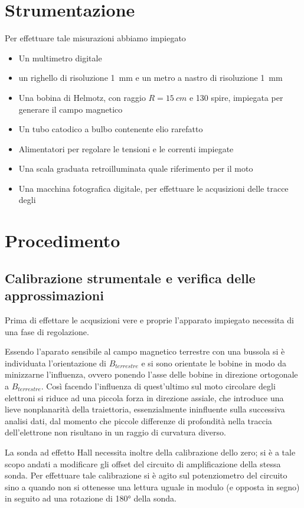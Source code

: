 \section{Strumentazione}
	Per effettuare tale misurazioni abbiamo impiegato
	\begin{itemize}[$\cdot$]
		\item Un multimetro digitale
		\item un righello di risoluzione \SI{1}{\mm} e un metro a nastro di risoluzione \SI{1}{\mm}
		\item Una bobina di Helmotz, con raggio $R = \SI{15}{cm}$ e 130 spire, impiegata per generare il campo magnetico
		\item Un tubo catodico a bulbo contenente elio rarefatto
		\item Alimentatori per regolare le tensioni e le correnti impiegate
		\item Una scala graduata retroilluminata quale riferimento per il moto
		\item Una macchina fotografica digitale, per effettuare le acqusizioni
		delle tracce degli \e
	\end{itemize}
\section{Procedimento}
	\subsection{Calibrazione strumentale e verifica delle approssimazioni}
		Prima di effettare le acqusizioni vere e proprie l'apparato impiegato necessita di una
		fase di regolazione.

		Essendo l'aparato sensibile al campo magnetico terrestre
		con una bussola si è individuata l'orientazione di $B_{terrestre}$
		e si sono orientate le bobine in modo da minizzarne l'influenza, ovvero ponendo
		l'asse delle bobine in direzione ortogonale a $B_{terrestre}$. Così facendo l'influenza
		di quest'ultimo sul moto circolare degli elettroni si riduce ad una
		piccola forza in direzione assiale, che introduce una lieve nonplanarità della traiettoria,
		essenzialmente ininfluente sulla successiva analisi dati, dal momento che
		piccole differenze di profondità nella traccia dell'elettrone non risultano
		in un raggio di curvatura diverso.

		La sonda ad effetto Hall necessita inoltre della calibrazione dello zero;
		si è a tale scopo andati a modificare gli offset del circuito di amplificazione della stessa sonda.
		Per effettuare tale calibrazione si è agito sul potenziometro del circuito sino
		a quando non si ottenesse una lettura uguale in modulo (e opposta in segno)
		in seguito ad una rotazione di \ang{180} della sonda.

